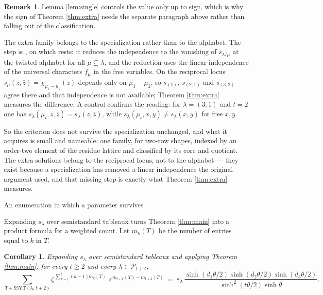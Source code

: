 \documentclass[11pt,reqno]{amsart}
\makeatletter
\renewcommand\section{\@startsection{section}{1}%
  \z@{\linespacing\@plus\linespacing}{.5\linespacing}%
  {\normalfont\large\bfseries\centering}}
\theoremstyle{plain}
\newtheorem{corollary}[theorem]{Corollary}
\theoremstyle{definition}
\newtheorem{remark}[theorem]{Remark}
\newcommand{\PP}{\mathcal{P}}
\newcommand{\zt}{\mu_t}
\newcommand{\zb}{\bar z}
\makeatother
\begin{document}
\begin{remark}\label{rem:why}
Lemma \ref{lem:single} controls the value only up to sign, which is why the sign of Theorem
\ref{thm:extra} needs the separate paragraph above rather than falling out of the classification.

The extra family belongs to the specialization rather than to the alphabet. The step is
\cite[Lemma 5.2]{AK25}, on which \cite[Theorem 5.3]{AK25} rests: it reduces the independence to the
vanishing of $s_{\lambda/\mu}$ at the twisted alphabet for all $\mu\subsetneq\lambda$, and the
reduction uses the linear independence of the universal characters $f_\mu$ in the free variables. On the reciprocal locus $s_\mu(z,\zb)=\chi_{\mu_1-\mu_2}(z)$
depends only on $\mu_1-\mu_2$, so $s_{(1)}$, $s_{(2,1)}$ and $s_{(3,2)}$ agree there and that
independence is not available; Theorem \ref{thm:extra} measures the difference. A control confirms
the reading: for $\lambda=(3,1)$ and $t=2$ one has $s_\lambda(\zt,z,\zb)=s_\lambda(z,\zb)$, while
$s_\lambda(\zt,x,y)\ne s_\lambda(x,y)$ for free $x,y$.
\end{remark}

So the criterion does not survive the specialization unchanged, and what it acquires is small and
nameable: one family, for two-row shapes, indexed by an order-two element of the residue lattice and
classified by its core and quotient. The extra solutions belong to the reciprocal locus, not to the
alphabet --- they exist because a specialization has removed a linear independence the original
argument used, and that missing step is exactly what Theorem \ref{thm:extra} measures.

\section{An enumeration in which a parameter survives}\label{sec:enum}

Expanding $s_\lambda$ over semistandard tableaux turns Theorem \ref{thm:main} into a product formula
for a weighted count. Let $m_k(T)$ be the number of entries equal to $k$ in $T$.

\begin{corollary}\label{cor:enum}
Expanding $s_\lambda$ over semistandard tableaux and applying Theorem \ref{thm:main}: for every
$t\ge2$ and every $\lambda\in\PP_{t+2}$,
\[
\sum_{T\in\mathrm{SSYT}(\lambda,\,t+2)}
\zeta^{\,\sum_{k=1}^{t}(k-1)m_k(T)}\;z^{\,m_{t+1}(T)-m_{t+2}(T)}
\;=\;\varepsilon_\lambda\,
\frac{\sinh(d_1\theta/2)\sinh(d_2\theta/2)\sinh(d_3\theta/2)}{\sinh^2(t\theta/2)\sinh\theta}.
\]
\end{corollary}
\end{document}
